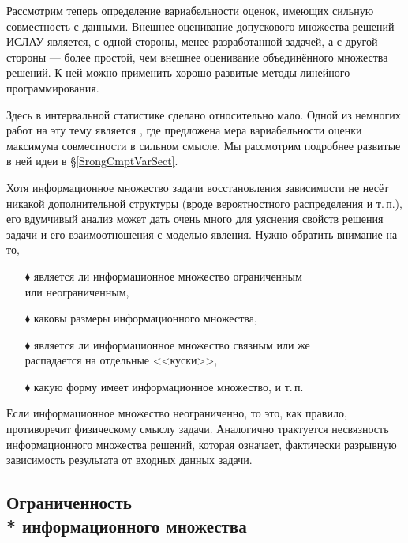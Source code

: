 \documentclass[a5paper,openany]{book}
\begin{document}
Рассмотрим теперь определение вариабельности оценок, имеющих сильную совместность 
с данными. Внешнее оценивание допускового множества решений ИСЛАУ является, с одной 
стороны, менее разработанной задачей, а с другой стороны --- более простой, чем 
внешнее оценивание объединённого множества решений. К ней можно применить хорошо 
развитые методы линейного программирования. 
  
  
Здесь в интервальной статистике сделано относительно мало. Одной из немногих работ 
на эту тему является \cite{SShary2019}, где предложена мера вариабельности оценки 
максимума совместности в сильном смысле. Мы рассмотрим подробнее развитые в ней 
идеи в \S\ref{SrongCmptVarSect}. 
  
Хотя информационное множество задачи восстановления зависимости не несёт никакой 
дополнительной структуры (вроде вероятностного распределения и т.\,п.), его вдумчивый 
анализ может дать очень много для уяснения свойств решения задачи и его взаимоотношения 
с моделью явления. Нужно обратить внимание на то, 
\begin{itemize} 
\item[\color{red}$\blacklozenge$]  
является ли информационное множество ограниченным \\ 
или неограниченным, 
\item[\color{red}$\blacklozenge$] 
каковы размеры информационного множества, 
\item[\color{red}$\blacklozenge$]  
является ли информационное множество связным или же \\ 
распадается на отдельные <<куски>>, 
\item[\color{red}$\blacklozenge$] 
какую форму имеет информационное множество, и т.\,п. 
\end{itemize} 
Если информационное множество неограниченно, то это, как правило, противоречит 
физическому смыслу задачи. Аналогично трактуется несвязность информационного множества 
решений, которая означает, фактически разрывную зависимость результата от входных 
данных задачи. 
  
    
  
\subsection[Ограниченность информационного множества]%
           {Ограниченность \\* информационного множества} 
  
\end{document}
